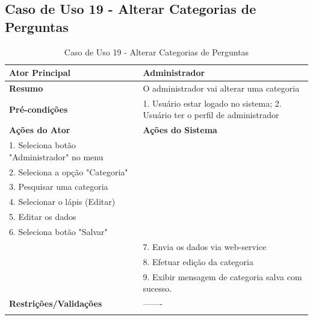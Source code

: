 \subsection{Caso de Uso 19 - Alterar Categorias de Perguntas}
\label{sc:case19}
\begin{center}
\begin{longtable}{p{8cm}|p{8cm}}
    \hline
    \textbf{Ator Principal} & Administrador \\
    \hline
    \textbf{Resumo} & O administrador vai alterar uma categoria \\
    \hline
    \textbf{Pr\'{e}-condi\c{c}\~{o}es} & 1. Usuário estar logado no sistema; 2. Usuário ter o perfil de administrador \\
    \hline
    \textbf{A\c{c}\~{o}es do Ator} & \textbf{A\c{c}\~{o}es do Sistema} \\
    \hline
    1. Seleciona botão "Administrador" no menu \\
    \hline
    2. Seleciona a opção "Categoria" \\
	\hline
    3. Pesquisar uma categoria \\
	\hline
    4. Selecionar o lápis (Editar) \\
	\hline
    5. Editar os dados \\
	\hline
    6. Seleciona botão "Salvar" \\
    \hline
    & 7. Envia os dados via web-service \\
	\hline
    & 8. Efetuar edição da categoria \\
	\hline
    & 9. Exibir mensagem de categoria salva com sucesso. \\
    \hline
    \hline
    \textbf{Restri\c{c}\~{o}es/Valida\c{c}\~{o}es} & -------\\
\hline
\caption{Caso de Uso 19 - Alterar Categorias de Perguntas}
\end{longtable}
\end{center}

